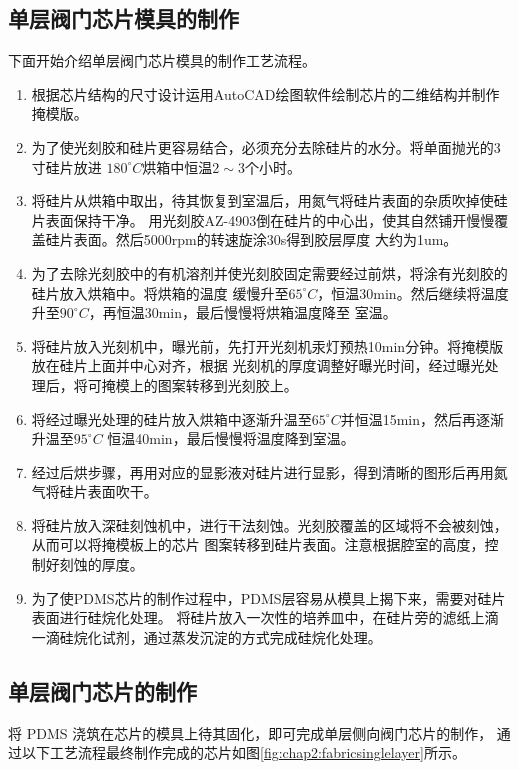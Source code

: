 \subsection{单层阀门芯片模具的制作}
	下面开始介绍单层阀门芯片模具的制作工艺流程。
	\begin{enumerate}[label={(\arabic*)},font={\color{black!50!black}\bfseries}]
	\item 根据芯片结构的尺寸设计运用AutoCAD绘图软件绘制芯片的二维结构并制作掩模版。
	\item 为了使光刻胶和硅片更容易结合，必须充分去除硅片的水分。将单面抛光的3寸硅片放进
	$180^\circ C$烘箱中恒温$2\sim3$个小时。
	\item 将硅片从烘箱中取出，待其恢复到室温后，用氮气将硅片表面的杂质吹掉使硅片表面保持干净。
	用光刻胶AZ-4903倒在硅片的中心出，使其自然铺开慢慢覆盖硅片表面。然后5000rpm的转速旋涂30s得到胶层厚度
	大约为1um。
	\item 为了去除光刻胶中的有机溶剂并使光刻胶固定需要经过前烘，将涂有光刻胶的硅片放入烘箱中。将烘箱的温度
	缓慢升至$65^\circ C$，恒温30min。然后继续将温度升至$90^\circ C$，再恒温30min，最后慢慢将烘箱温度降至
	室温。
	\item 将硅片放入光刻机中，曝光前，先打开光刻机汞灯预热10min分钟。将掩模版放在硅片上面并中心对齐，根据
	光刻机的厚度调整好曝光时间，经过曝光处理后，将可掩模上的图案转移到光刻胶上。
	\item 将经过曝光处理的硅片放入烘箱中逐渐升温至$65^\circ C$并恒温15min，然后再逐渐升温至$95^\circ C$
	恒温40min，最后慢慢将温度降到室温。
	\item 经过后烘步骤，再用对应的显影液对硅片进行显影，得到清晰的图形后再用氮气将硅片表面吹干。
	\item 将硅片放入深硅刻蚀机中，进行干法刻蚀。光刻胶覆盖的区域将不会被刻蚀，从而可以将掩模板上的芯片
	图案转移到硅片表面。注意根据腔室的高度，控制好刻蚀的厚度。
	\item 为了使PDMS芯片的制作过程中，PDMS层容易从模具上揭下来，需要对硅片表面进行硅烷化处理。
	将硅片放入一次性的培养皿中，在硅片旁的滤纸上滴一滴硅烷化试剂，通过蒸发沉淀的方式完成硅烷化处理。
	\end{enumerate}
\subsection{单层阀门芯片的制作}
	将 PDMS 浇筑在芯片的模具上待其固化，即可完成单层侧向阀门芯片的制作，
  通过以下工艺流程最终制作完成的芯片如图\ref{fig:chap2:fabricsinglelayer}所示。

